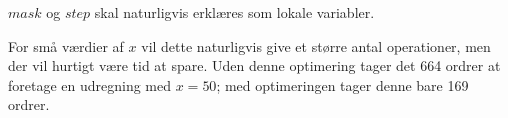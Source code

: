 \documentclass[12pt,a4paper]{article}
\begin{document}
$mask$ og $step$ skal naturligvis erklæres som lokale variabler.

For små værdier af $x$ vil dette naturligvis give et større antal operationer,
men der vil hurtigt være tid at spare. Uden denne optimering tager det 664
ordrer at foretage en udregning med $x=50$; med optimeringen tager denne bare
169 ordrer.
%
\end{document}
